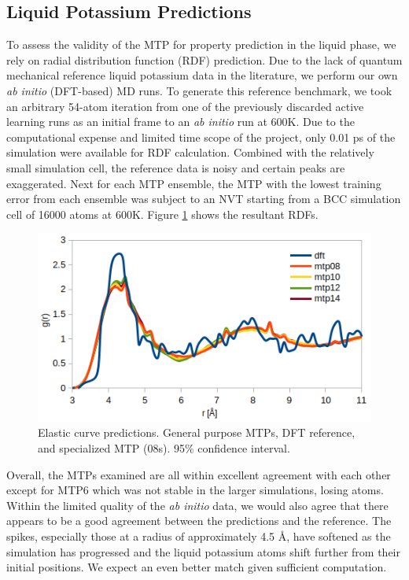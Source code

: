 \documentclass[9pt,twocolumn,twoside]{opticajnl}
\begin{document}
\subsection{Liquid Potassium Predictions}
To assess the validity of the MTP for property prediction in the liquid phase, we rely on radial distribution function (RDF) prediction. Due to the lack of quantum mechanical reference liquid potassium data in the literature, we perform our own \textit{ab initio} (DFT-based) MD runs. To generate this reference benchmark, we took an arbitrary 54-atom iteration from one of the previously discarded active learning runs as an initial frame to an \textit{ab initio} run at 600K. Due to the computational expense and limited time scope of the project, only 0.01 ps of the simulation were available for RDF calculation. Combined with the relatively small simulation cell, the reference data is noisy and certain peaks are exaggerated. Next for each MTP ensemble, the MTP with the lowest training error from each ensemble was subject to an NVT starting from a BCC simulation cell of 16000 atoms at 600K. Figure \ref{fig:rdf} shows the resultant RDFs.

\begin{figure}[ht]
  \centering
  \includegraphics[width=\linewidth]{assets/rdf.png}
  \caption{Elastic curve predictions. General purpose MTPs, DFT reference, and specialized MTP (08s). 95\% confidence interval.}
  \label{fig:rdf}
\end{figure}

Overall, the MTPs examined are all within excellent agreement with each other except for MTP6 which was not stable in the larger simulations, losing atoms. Within the limited quality of the \textit{ab initio} data, we would also agree that there appears to be a good agreement between the predictions and the reference. The spikes, especially those at a radius of approximately 4.5 Å, have softened as the simulation has progressed and the liquid potassium atoms shift further from their initial positions. We expect an even better match given sufficient computation.
\end{document}
